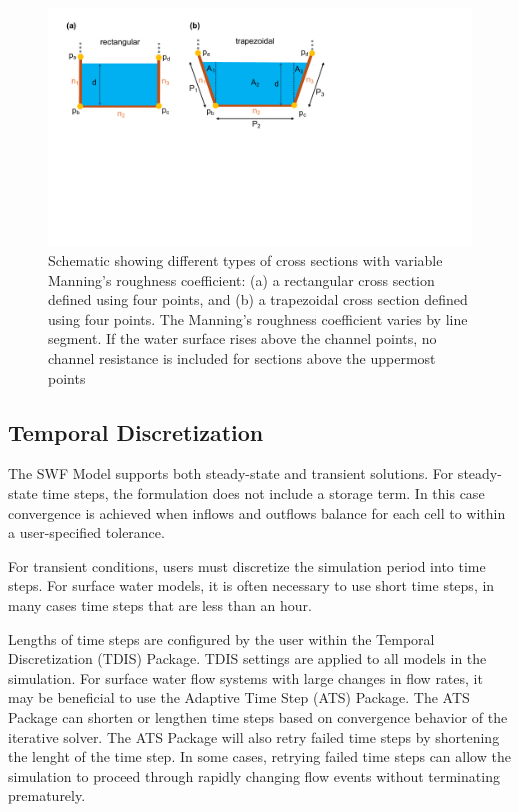 \documentclass[fleqn]{article}
\begin{document}
\begin{figure}[h!tbp]
	\centering
	\includegraphics[scale=0.5]{figures/cxs_rough.pdf}
	\caption[Schematic showing different types of channel cross sections with variable roughness.]{Schematic showing different types of cross sections with variable Manning's roughness coefficient: (a) a rectangular cross section defined using four points, and (b) a trapezoidal cross section defined using four points.  The Manning's roughness coefficient varies by line segment.  If the water surface rises above the channel points, no channel resistance is included for sections above the uppermost points}
	\label{fig:cxs_rough}
\end{figure}

\subsection{Temporal Discretization}

The SWF Model supports both steady-state and transient solutions.  For steady-state time steps, the formulation does not include a storage term.  In this case convergence is achieved when inflows and outflows balance for each cell to within a user-specified tolerance.

For transient conditions, users must discretize the simulation period into time steps.  For surface water models, it is often necessary to use short time steps, in many cases time steps that are less than an hour. 

Lengths of time steps are configured by the user within the Temporal Discretization (TDIS) Package.  TDIS settings are applied to all models in the simulation.  For surface water flow systems with large changes in flow rates, it may be beneficial to use the Adaptive Time Step (ATS) Package.  The ATS Package can shorten or lengthen time steps based on convergence behavior of the iterative solver.  The ATS Package will also retry failed time steps by shortening the lenght of the time step.  In some cases, retrying failed time steps can allow the simulation to proceed through rapidly changing flow events without terminating prematurely.
\end{document}
